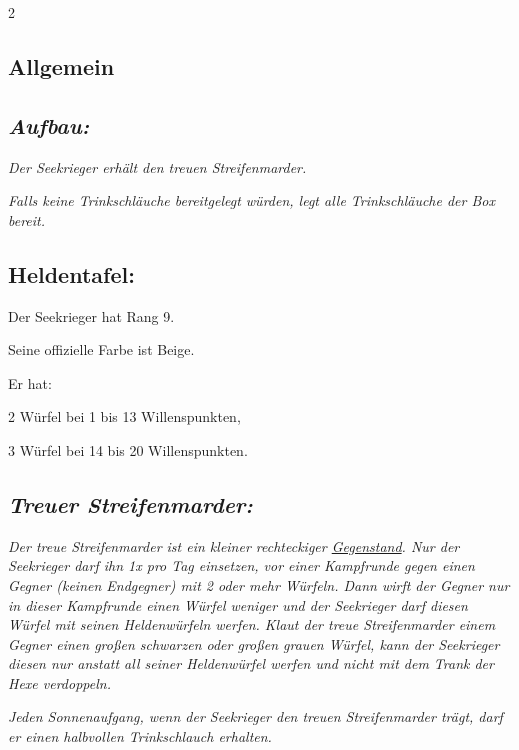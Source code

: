 \documentclass[10pt, a4paper, oneside]{book}
\newcommand{\fan}[1]{\textit{#1}}
\begin{document}
\begin{multicols*}{2}\raggedcolumns


\begin{nobgcolor}

\section{Allgemein}

\subsection{\fan{Aufbau:}}

\fan{Der Seekrieger erhält den treuen Streifenmarder.}

\fan{Falls keine Trinkschläuche bereitgelegt würden, legt alle Trinkschläuche der Box bereit.}



\subsection{Heldentafel:}

Der Seekrieger hat Rang 9.

Seine offizielle Farbe ist Beige.

Er hat:

\bullet{} 2 Würfel bei 1 bis 13 Willenspunkten,

\bullet{} 3 Würfel bei 14 bis 20 Willenspunkten.




\subsection{\fan{Treuer Streifenmarder:}}

\fan{Der treue Streifenmarder ist ein kleiner rechteckiger \hyperref[Gegenstände und Sonderplättchen]{Gegenstand}. Nur der Seekrieger darf ihn 1x pro Tag einsetzen, vor einer Kampfrunde gegen einen Gegner (keinen Endgegner) mit 2 oder mehr Würfeln. Dann wirft der Gegner nur in dieser Kampfrunde einen Würfel weniger und der Seekrieger darf diesen Würfel mit seinen Heldenwürfeln werfen. Klaut der treue Streifenmarder einem Gegner einen großen schwarzen oder großen grauen Würfel, kann der Seekrieger diesen nur anstatt all seiner Heldenwürfel werfen und nicht mit dem Trank der Hexe verdoppeln.}

\fan{Jeden Sonnenaufgang, wenn der Seekrieger den treuen Streifenmarder trägt, darf er einen halbvollen Trinkschlauch erhalten.}


\end{nobgcolor}
\end{multicols*}
\end{document}
